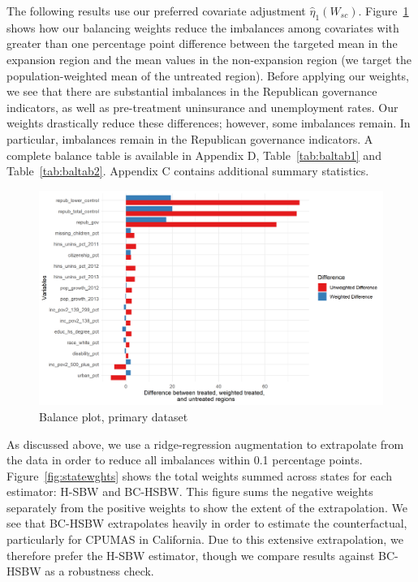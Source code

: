 \documentclass[12pt]{article}
\begin{document}
The following results use our preferred covariate adjustment $\hat{\eta}_1(W_{sc})$. Figure~\ref{fig:loveplotc1} shows how our balancing weights reduce the imbalances among covariates with greater than one percentage point difference between the targeted mean in the expansion region and the mean values in the non-expansion region (we target the population-weighted mean of the untreated region). Before applying our weights, we see that there are substantial imbalances in the Republican governance indicators, as well as pre-treatment uninsurance and unemployment rates. Our weights drastically reduce these differences; however, some imbalances remain. In particular, imbalances remain in the Republican governance indicators. A complete balance table is available in Appendix D, Table~\ref{tab:baltab1} and Table~\ref{tab:baltab2}. Appendix C contains additional summary statistics.

\begin{figure}[B]
\begin{center}
    \includegraphics[scale=0.6]{01_Plots/balance-plot-etu.png}
    \caption{Balance plot, primary dataset}
    \label{fig:loveplotc1}
\end{center}
\end{figure}

As discussed above, we use a ridge-regression augmentation to extrapolate from the data in order to reduce all imbalances within 0.1 percentage points. Figure~\ref{fig:statewghts} shows the total weights summed across states for each estimator: H-SBW and BC-HSBW. This figure sums the negative weights separately from the positive weights to show the extent of the extrapolation. We see that BC-HSBW extrapolates heavily in order to estimate the counterfactual, particularly for CPUMAS in California. Due to this extensive extrapolation, we therefore prefer the H-SBW estimator, though we compare results against BC-HSBW as a robustness check.
\end{document}
